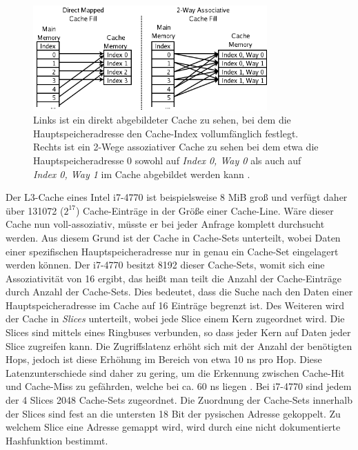 \label{fig:CacheAsso}
\begin{figure}[h]
\centering
\includegraphics[width=0.8\textwidth]{basics/Cache_Asso.png}
\caption{Links ist ein direkt abgebildeter Cache zu sehen, bei dem die Hauptspeicheradresse den Cache-Index vollumfänglich festlegt. Rechts ist ein 2-Wege assoziativer Cache zu sehen bei dem etwa die Hauptspeicheradresse 0 sowohl auf \textit{Index 0, Way 0} als auch auf \textit{Index 0, Way 1} im Cache abgebildet werden kann \cite{CacheAssoWiki}.}
\end{figure}


Der L3-Cache eines Intel i7-4770 ist beispielsweise 8 MiB groß und verfügt daher über 131072 ($2^{17}$) Cache-Einträge in der Größe einer Cache-Line. 
Wäre dieser Cache nun voll-assoziativ, müsste er bei jeder Anfrage komplett durchsucht werden. Aus diesem Grund ist der Cache in Cache-Sets unterteilt, wobei Daten einer spezifischen Hauptspeicheradresse nur in genau ein Cache-Set eingelagert werden können. 
Der i7-4770 besitzt 8192 dieser Cache-Sets, womit sich eine Assoziativität von 16 ergibt, das heißt man teilt die Anzahl der Cache-Einträge durch Anzahl der Cache-Sets. Dies bedeutet, dass die Suche nach den Daten einer Hauptspeicheradresse im Cache auf 16 Einträge begrenzt ist. 
Des Weiteren wird der Cache in \textit{Slices} unterteilt, wobei jede Slice einem Kern zugeordnet wird. Die Slices sind mittels eines Ringbuses verbunden, so dass jeder Kern auf Daten jeder Slice zugreifen kann. Die Zugriffslatenz erhöht sich mit der Anzahl der benötigten Hops, jedoch ist diese Erhöhung im Bereich von etwa 10 ns pro Hop. Diese Latenzunterschiede sind daher zu gering, um die Erkennung zwischen Cache-Hit und Cache-Miss zu gefährden, welche bei ca. 60 ns liegen \cite{TheSpyInTheSandbox}. Bei i7-4770 sind jedem der 4 Slices 2048 Cache-Sets zugeordnet. Die Zuordnung der Cache-Sets innerhalb der Slices sind fest an die untersten 18 Bit der pysischen Adresse gekoppelt. Zu welchem Slice eine Adresse gemappt wird, wird durch eine nicht dokumentierte Hashfunktion bestimmt.

